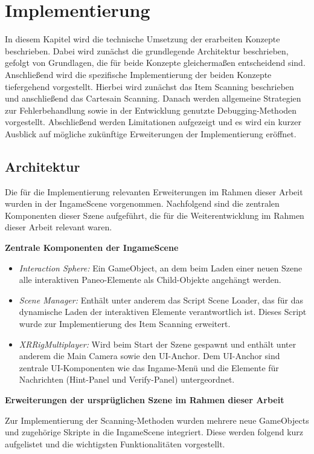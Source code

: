 \chapter{Implementierung}

In diesem Kapitel wird die technische Umsetzung der erarbeiten Konzepte beschrieben. Dabei wird zunächst die grundlegende Architektur beschrieben, gefolgt von Grundlagen, die für beide Konzepte gleichermaßen entscheidend sind. Anschließend wird die spezifische Implementierung der beiden Konzepte tiefergehend vorgestellt. Hierbei wird zunächst das Item Scanning beschrieben und anschließend das Cartesain Scanning. Danach werden allgemeine Strategien zur Fehlerbehandlung sowie in der Entwicklung genutzte Debugging-Methoden vorgestellt. Abschließend werden Limitationen aufgezeigt und es wird ein kurzer Ausblick auf mögliche zukünftige Erweiterungen der Implementierung eröffnet. 

\section{Architektur}
Die für die Implementierung relevanten Erweiterungen im Rahmen dieser Arbeit wurden in der IngameScene vorgenommen. Nachfolgend sind die zentralen Komponenten dieser Szene aufgeführt, die für die Weiterentwicklung im Rahmen dieser Arbeit relevant waren. 

{\normalfont \bfseries Zentrale Komponenten der IngameScene}

\begin{itemize}
    \item \textit{Interaction Sphere:} Ein GameObject, an dem beim Laden einer neuen Szene alle interaktiven Paneo-Elemente als Child-Objekte angehängt werden.
    \item \textit{Scene Manager:} Enthält unter anderem das Script Scene Loader, das für das dynamische Laden der interaktiven Elemente verantwortlich ist. Dieses Script wurde zur Implementierung des Item Scanning erweitert. 
    \item \textit{XRRigMultiplayer:} Wird beim Start der Szene gespawnt und enthält unter anderem die Main Camera sowie den UI-Anchor. Dem UI-Anchor sind zentrale UI-Komponenten wie das Ingame-Menü und die Elemente für Nachrichten (Hint-Panel und Verify-Panel) untergeordnet.    
\end{itemize}

{\normalfont \bfseries Erweiterungen der ursprüglichen Szene im Rahmen dieser Arbeit}

Zur Implementierung der Scanning-Methoden wurden mehrere neue GameObjects und zugehörige Skripte in die IngameScene integriert. Diese werden folgend kurz aufgelistet und die wichtigsten Funktionalitäten vorgestellt. 

